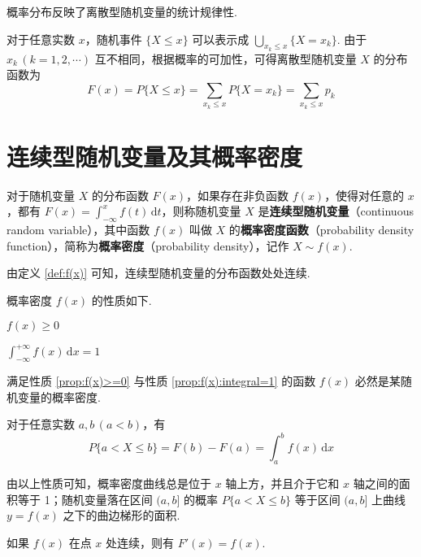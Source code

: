 概率分布反映了离散型随机变量的统计规律性.

对于任意实数 $x$，随机事件 $\{X \leqslant x\}$ 可以表示成 $\displaystyle\bigcup_{x_k \leqslant x} \{X=x_k\}$. 由于 $x_k\, (k=1,2,\cdots)$ 互不相同，根据概率的可加性，可得离散型随机变量 $X$ 的分布函数为
$$
F(x) = P\{X \leqslant x\} = \sum_{x_k \leqslant x} P\{X=x_k\} = \sum_{x_k \leqslant x} p_k
$$

\section{连续型随机变量及其概率密度}

\begin{definition} \label{def:f(x)}
    对于随机变量 $X$ 的分布函数 $F(x)$，如果存在非负函数 $f(x)$，使得对任意的 $x$，都有 $F(x)=\displaystyle\int_{-\infty}^x f(t)\,\text{d}t$，则称随机变量 $X$ 是\textbf{连续型随机变量}（continuous random variable），其中函数 $f(x)$ 叫做 $X$ 的\textbf{概率密度函数}（probability density function），简称为\textbf{概率密度}（probability density），记作 $X \sim f(x)$.
\end{definition}

由定义 \ref{def:f(x)} 可知，连续型随机变量的分布函数处处连续.

概率密度 $f(x)$ 的性质如下.

\setcounter{propertyname}{0}

\begin{property} \label{prop:f(x)>=0}
    $f(x) \geqslant 0$
\end{property}

\begin{property} \label{prop:f(x):integral=1}
    $\displaystyle\int_{-\infty}^{+\infty} f(x)\,\text{d}x = 1$
\end{property}

满足性质 \ref*{prop:f(x)>=0} 与性质 \ref*{prop:f(x):integral=1} 的函数 $f(x)$ 必然是某随机变量的概率密度.

\begin{property}
    对于任意实数 $a,b\,(a<b)$，有
    $$
    P\{a < X \leqslant b\}=F(b)-F(a)=\int_a^b f(x)\,\text{d}x
    $$
\end{property}

由以上性质可知，概率密度曲线总是位于 $x$ 轴上方，并且介于它和 $x$ 轴之间的面积等于 1；随机变量落在区间 $(a,b]$ 的概率 $P\{a < X \leqslant b\}$ 等于区间 $(a,b]$ 上曲线 $y=f(x)$ 之下的曲边梯形的面积.

\begin{property} \label{prop:F'(x)=f(x)}
    如果 $f(x)$ 在点 $x$ 处连续，则有 $F'(x)=f(x)$.
\end{property}

